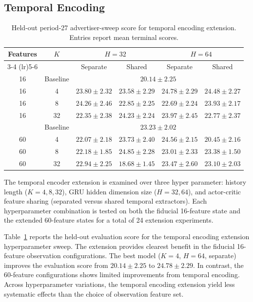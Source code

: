 \documentclass{article}
\begin{document}
\subsection{Temporal Encoding}
\begin{table}[h]
    \centering
    \small
    \caption{Held-out period-27 advertiser-sweep score for temporal encoding extension. 
    Entries report mean terminal scores.}
    \label{tab:temporal-eval}
    \begin{tabular}{@{}cccccc@{}}
        \toprule
        Features & $K$ & \multicolumn{2}{c}{$H=32$} & \multicolumn{2}{c}{$H=64$} \\
        \cmidrule(lr){3-4} \cmidrule(lr){5-6}
         &  & Separate & Shared & Separate & Shared \\
        \midrule
        16 & Baseline & \multicolumn{4}{c}{$20.14 \pm 2.25$} \\
        16 & 4 & $23.80 \pm 2.32$ & $23.58 \pm 2.29$ & $24.78 \pm 2.29$ & $24.48 \pm 2.27$ \\
        16 & 8 & $24.26 \pm 2.46$ & $22.85 \pm 2.25$ & $22.69 \pm 2.24$ & $23.93 \pm 2.17$ \\
        16 & 32 & $22.35 \pm 2.38$ & $24.23 \pm 2.24$ & $23.97 \pm 2.45$ & $22.77 \pm 2.37$ \\
        \addlinespace
        60 & Baseline & \multicolumn{4}{c}{$23.23\pm 2.02$} \\
        60 & 4 & $22.07 \pm 2.18$ & $23.73 \pm 2.40$ & $24.56 \pm 2.15$ & $20.45 \pm 2.16$ \\
        60 & 8 & $22.18 \pm 1.85$ & $24.85 \pm 2.28$ & $23.01 \pm 2.33$ & $23.38 \pm 1.50$ \\
        60 & 32 & $22.94 \pm 2.25$ & $18.68 \pm 1.45$ & $23.47 \pm 2.60$ & $23.10 \pm 2.03$ \\
        \bottomrule
    \end{tabular}
\end{table}


The temporal encoder extension is examined over three hyper parameter: history 
length ($K = 4, 8, 32$), GRU hidden dimension size ($H = 32, 64$), and actor-critic feature sharing 
(separated versus shared temporal extractors). Each hyperparameter combination is tested on both 
the fiducial 16-feature state and the extended 60-feature states for a total of 24 extension 
experiments.

Table~\ref{tab:temporal-eval} reports the held-out evaluation score for the temporal encoding 
extension hyperparameter sweep. The extension provides clearest benefit in the fiducial
16-feature observation configurations. The best model ($K = 4$, $H = 64$, separate) 
improves the evaluation score from $20.14\pm 2.25$ to $24.78\pm 2.29$. 
In contrast, the 60-feature configurations 
shows limited improvements from temporal encoding. Across hyperparameter variations, the 
temporal encoding extension yield less systematic effects than the choice of observation
feature set. 
\end{document}
